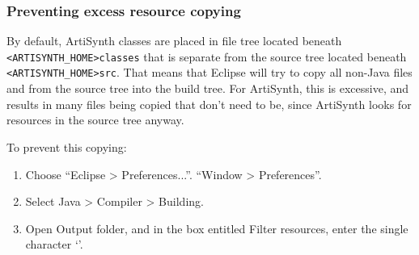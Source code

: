\subsubsection{Preventing excess resource copying}

By default, ArtiSynth classes are placed in file tree located beneath
{\tt <ARTISYNTH\_HOME>\SEP classes} that is separate from the source
tree located beneath {\tt <ARTISYNTH\_HOME>\SEP src}.
That means that Eclipse will try to copy all non-Java files and
\directories{} from the source tree into the build tree. For ArtiSynth,
this is excessive, and results in many files being copied that don't
need to be, since ArtiSynth looks for resources in the source tree
anyway.

To prevent this copying:

\begin{enumerate}

\item Choose
\ifMacOS
``{\sf Eclipse > Preferences...}''.
\else
``{\sf Window > Preferences}''.
\fi

\item Select {\sf Java > Compiler > Building}.

\item Open {\sf Output folder}, and in the box entitled {\sf Filter resources},
  enter the single character `{\tt *}'.

\end{enumerate}

%
%

